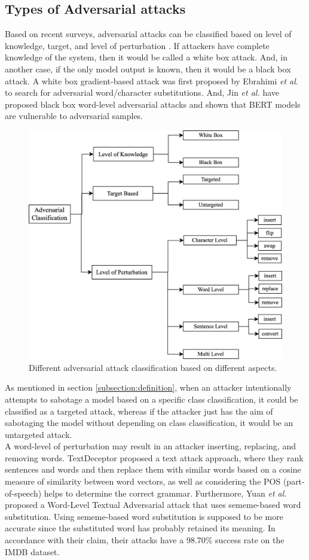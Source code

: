 \documentclass[%
	BCOR=8mm, %
	DIV=12,
	toc=bibliography, %
	toc=listof, %
	oneside, %
	egregdoesnotlikesansseriftitles, %
	]{scrbook}
\begin{document}
\subsection{Types of Adversarial attacks}
\label{subsection:attacktypes}
Based on recent surveys, adversarial attacks can be classified based on level of knowledge, target, and level of perturbation \cite{huq_adversarial_2020,wang_towards_2021}. If attackers have complete knowledge of the system, then it would be called a  white box attack. And, in another case, if the only model output is known, then it would be a black box attack. A white box gradient-based attack was first proposed by Ebrahimi \textit{et al.} \cite{ebrahimi_hotflip_2018} to search for adversarial word/character substitutions. And, Jin \textit{et al.} \cite{jin_is_2020} have proposed black box word-level adversarial attacks and shown that BERT models are vulnerable to adversarial samples.\\
\begin{figure}[h!]
    \centering
    \includegraphics[width=0.65\linewidth]{img/attack_classification.png}
    \caption[Adversarial attacks classification diagram]{Different adversarial attack classification based on different aspects.}
    \label{fig:attack_classification}
\end{figure}
As mentioned in section \ref{subsection:definition}, when an attacker intentionally attempts to sabotage a model based on a specific class classification, it could be classified as a targeted attack, whereas if the attacker just has the aim of sabotaging the model without depending on class classification, it would be an untargeted attack.\\
A word-level of perturbation may result in an attacker inserting, replacing, and removing words. TextDeceptor \cite{saxena_textdecepter_2020} proposed a text attack approach, where they rank sentences and words and then replace them with similar words based on a cosine measure of similarity between word vectors, as well as considering the POS (part-of-speech) helps to determine the correct grammar. Furthermore, Yuan \textit{et al.} \cite{zang_word-level_2019} proposed a Word-Level Textual Adversarial attack that uses sememe-based word substitution. Using sememe-based word substitution is supposed to be more accurate since the substituted word has probably retained its meaning. In accordance with their claim, their attacks have a 98.70\% success rate on the IMDB dataset.\\
\end{document}

